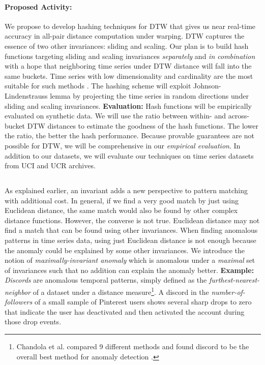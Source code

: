 \paragraph{Proposed Activity:}

We propose to develop hashing techniques for DTW that gives us near real-time accuracy in all-pair distance computation under warping. DTW captures the essence of two other invariances: sliding and scaling. Our plan is to build hash functions targeting sliding and scaling invariances {\it separately} and {\it in combination} with a hope that neighboring time series under DTW distance will fall into the same buckets. Time series with low dimensionality and cardinality are the most suitable for such methods \cite{Hu2011}. The hashing scheme will exploit Johnson-Lindenstrauss lemma \cite{Bingham2001} by projecting the time series in random directions under sliding and scaling invariances.
\textbf{Evaluation:} Hash functions will be empirically evaluated on synthetic data. We will use the ratio between within- and across-bucket DTW distances to estimate the goodness of the hash functions. The lower the ratio, the better the hash performance. Because provable guarantees are not possible for DTW, we will be comprehensive in our {\it empirical evaluation}. In addition to our datasets, we will evaluate our techniques on time series datasets from UCI and UCR archives.



\subsection{\Tthreetwo}

As explained earlier, an invariant adds a new perspective to pattern matching with additional cost. In general, if we find a very good match by just using Euclidean distance, the same match would also be found by other complex distance functions. However, the converse is not true. Euclidean distance may not find a match that can be found using other invariances. When finding anomalous patterns in time series data, using just Euclidean distance is not enough because the anomaly could be explained by some other invariances. We introduce the notion of {\it maximally-invariant anomaly} which is anomalous under a {\it maximal} set of invariances such that no addition can explain the anomaly better. \textbf{Example:}
{\it Discords} are anomalous temporal patterns, simply defined as the {\it furthest-nearest-neighbor} of a dataset under a distance measure\footnote{Chandola et al. compared 9 different methods and found discord to be the overall best method for anomaly detection \cite{Chandola:09}.}. A discord in the {\it number-of-followers} of  a small sample of Pinterest users shows several sharp drops to zero that indicate the user has deactivated and then activated the account during those drop events.

